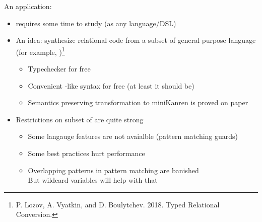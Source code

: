 \documentclass[aspectratio=169
  , xcolor={svgnames}
  , hyperref=
      { colorlinks
      , urlcolor=DarkBlue
      }
  , russian  %
  ]{beamer}
\begin{document}
\begin{frame}{An application: \noCanren}
\begin{itemize}
\item [\faBad] \miniKanren{} requires some time to study (as any language/DSL)
\item An idea: synthesize relational code from a subset of general purpose language (for example, \OCaml{})\footnote{P. Lozov, A. Vyatkin, and D. Boulytchev. 2018. Typed Relational Conversion.}
\begin{itemize}
\item[\faGood] Typechecker for free
\item[\faGood] Convenient \OCaml{}-like syntax  for free (at least it should be)
\item Semantics preserving transformation to miniKanren is proved on paper
\end{itemize}
\item  Restrictions on subset of \OCaml{} are quite strong
\begin{itemize}
\item Some langauge features are not avaialble (pattern matching guards)
\item Some \OCaml{} best practices hurt performance
\item Overlapping patterns in pattern matching are banished\\
But wildcard variables will help with that \faGood

\end{itemize}
\end{itemize}
\end{frame}

\end{document}
